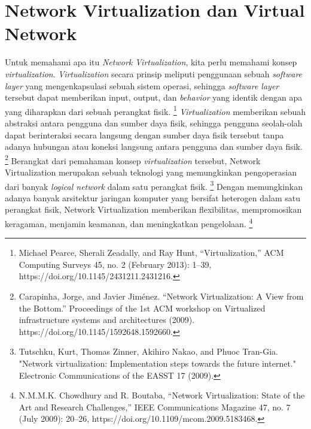 \section{Network Virtualization dan Virtual Network}
\label{sec:latex}
Untuk memahami apa itu \textit{Network Virtualization}, kita perlu memahami konsep \textit{virtualization}.
\textit{Virtualization} secara prinsip meliputi penggunaan sebuah \textit{software layer} yang mengenkapsulasi sebuah sistem operasi, sehingga
\textit{software layer} tersebut dapat memberikan input, output, dan \textit{behavior} yang identik dengan apa yang diharapkan dari sebuah perangkat fisik.
\footnote{Michael Pearce, Sherali Zeadally, and Ray Hunt, “Virtualization,” ACM Computing Surveys 45, no. 2 (February 2013): 1–39, https://doi.org/10.1145/2431211.2431216.}
\textit{Virtualization} memberikan sebuah abstraksi antara pengguna dan sumber daya fisik, sehingga pengguna seolah-olah dapat berinteraksi secara langsung dengan
sumber daya fisik tersebut tanpa adanya hubungan atau koneksi langsung antara pengguna dan sumber daya fisik.
\footnote{Carapinha, Jorge, and Javier Jiménez. “Network Virtualization: A View from the Bottom.” Proceedings of the 1st ACM workshop on Virtualized infrastructure systems and architectures (2009). https://doi.org/10.1145/1592648.1592660. }
Berangkat dari pemahaman konsep \textit{virtualization} tersebut, Network Virtualization merupakan sebuah teknologi yang memungkinkan pengoperasian dari 
banyak \textit{logical network} dalam satu perangkat fisik.
\footnote{Tutschku, Kurt, Thomas Zinner, Akihiro Nakao, and Phuoc Tran-Gia. "Network virtualization: Implementation steps towards the future internet." Electronic Communications of the EASST 17 (2009).}
Dengan memungkinkan adanya banyak arsitektur jaringan komputer yang bersifat heterogen dalam satu perangkat fisik, Network Virtualization memberikan flexibilitas, mempromosikan keragaman, menjamin keamanan, 
dan meningkatkan pengelolaan.
\footnote{N.M.M.K. Chowdhury and R. Boutaba, “Network Virtualization: State of the Art and Research Challenges,” IEEE Communications Magazine 47, no. 7 (July 2009): 20–26, https://doi.org/10.1109/mcom.2009.5183468.}
\par

